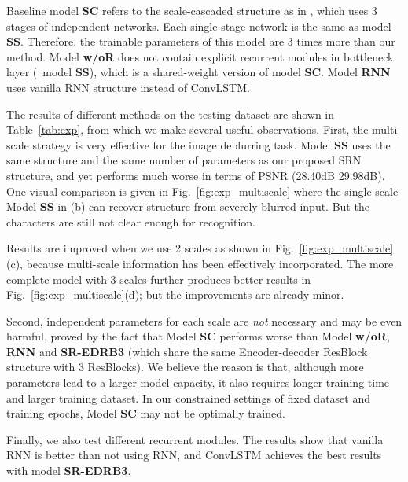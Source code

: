 \documentclass[10pt,twocolumn,letterpaper]{article}
\begin{document}
Baseline model \textbf{SC} refers to the scale-cascaded structure as in \cite{chen2017photographic,nah2017deep}, which uses 3 stages of independent networks. Each single-stage network is the same as model \textbf{SS}. Therefore, the trainable parameters of this model are 3 times more than our method. Model \textbf{w/oR} does not contain explicit recurrent modules in bottleneck layer (\ie~model \textbf{SS}), which is a shared-weight version of model \textbf{SC}. Model \textbf{RNN} uses vanilla RNN structure instead of ConvLSTM.

The results of different methods on the testing dataset are shown in Table~\ref{tab:exp}, from which we make several useful observations. First, the multi-scale strategy is very effective for the image deblurring task. Model \textbf{SS} uses the same structure and the same number of parameters as our proposed SRN structure, and yet performs much worse in terms of PSNR (28.40dB \vs 29.98dB). 
One visual comparison is given in Fig.~\ref{fig:exp_multiscale} where the single-scale Model \textbf{SS} in (b) can recover structure from severely blurred input. But the characters are still not clear enough for recognition. 

Results are improved when we use 2 scales as shown in Fig.~\ref{fig:exp_multiscale}(c), because multi-scale information has been effectively incorporated. The more complete model with 3 scales further produces better results in Fig.~\ref{fig:exp_multiscale}(d); but the improvements are already minor.

Second, independent parameters for each scale are \emph{not} necessary and may be even harmful, proved by the fact that Model \textbf{SC} performs worse than Model \textbf{w/oR}, \textbf{RNN} and \textbf{SR-EDRB3} (which share the same Encoder-decoder ResBlock structure with 3 ResBlocks). We believe the reason is that, although more parameters lead to a larger model capacity, it also requires longer training time and larger training dataset. In our constrained settings of fixed dataset and training epochs, Model \textbf{SC} may not be optimally trained. 

Finally, we also test different recurrent modules. The results show that vanilla RNN is better than not using RNN, and ConvLSTM achieves the best results with model \textbf{SR-EDRB3}.
\end{document}
